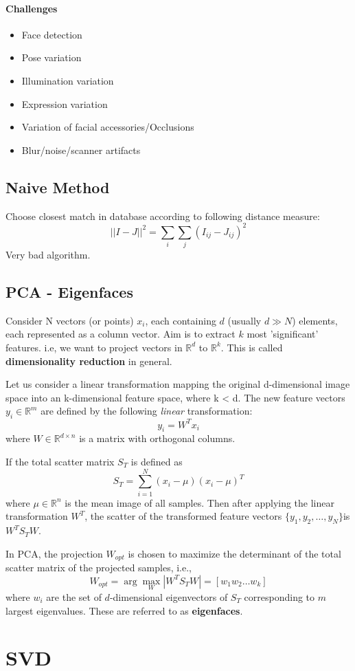 \documentclass[a4paper,11pt]{article}
\begin{document}
\paragraph{Challenges}
\begin{itemize}
\item Face detection
\item Pose variation
\item Illumination variation
\item Expression variation
\item Variation of facial accessories/Occlusions
\item Blur/noise/scanner artifacts
\end{itemize}

\subsection{Naive Method}
Choose closest match in database according to following distance measure:
\[||I - J||^2 = \sum_i \sum_j (I_{ij} - J_{ij})^2 \]
Very bad algorithm.

\subsection{PCA - Eigenfaces}
Consider N vectors (or points) $x_i$, each containing $d$ (usually $d \gg N$) elements, each represented as a column vector. 
Aim is to extract $k$ most 'significant' features. i.e, we want to project vectors in $\mathbb{R}^d$ to $\mathbb{R}^k$. This is called \textbf{dimensionality reduction} in general. 

Let us consider a linear transformation mapping the original d-dimensional image space into an k-dimensional feature space, where k < d. 
The new feature vectors $y_i \in \mathbb{R}^m$ are defined by the following \emph{linear} transformation:
\[ y_i = W^T x_i\]
where $W \in \mathbb{R}^{d \times n}$ is a matrix with orthogonal columns.

If the total scatter matrix $S_T$ is defined as 
\[S_T = \sum_{i = 1}^N (x_i - \mu )(x_i - \mu)^T \]
where $\mu \in \mathbb{R}^n$ is the mean image of all samples. 
Then after applying the linear transformation $W^T$, the scatter of the transformed feature
vectors $\{y_1 , y_2, \dots, y_N \}$is $W^T S_T W$. 

In PCA, the projection $W_{opt}$ is chosen to maximize the determinant of the total scatter matrix of the projected samples, i.e.,
\[W_{opt} = \arg \max_W |W^TS_TW| = [w_1 w_2 \dots w_k]\]
where $w_i$ are the set of $d$-dimensional eigenvectors of $S_T$ corresponding to $m$ largest eigenvalues. These are referred to as \textbf{eigenfaces}.



\section{SVD}
\end{document}
